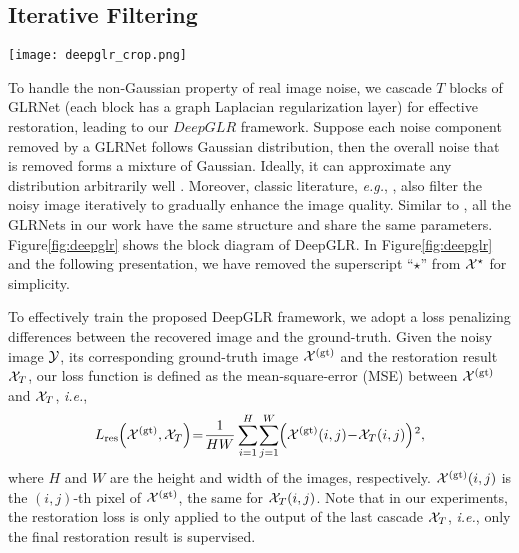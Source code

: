 \documentclass[10pt,twocolumn,letterpaper]{article}
\begin{document}
\subsection{Iterative Filtering}\label{ssec:iter}
\begin{figure*}[t]
\centering
    \texttt{[image: deepglr\_crop.png]}
\caption{Block diagram of the overall DeepGLR framework.}
\label{fig:deepglr}
\end{figure*}
To handle the non-Gaussian property of real image noise, we cascade $T$ blocks of GLRNet (each block has a graph Laplacian regularization layer) for effective restoration, leading to our $DeepGLR$ framework.
Suppose each noise component removed by a GLRNet follows Gaussian distribution, then the overall noise that is removed forms a mixture of Gaussian. 
Ideally, it can approximate any distribution arbitrarily well \cite{reynolds2015gaussian}. 
Moreover, classic literature, {\it e.g.}, \cite{elad2006image,milanfar2013tour,dabov2007image}, also filter the noisy image iteratively to gradually enhance the image quality. 
Similar to \cite{vemulapalli2016deep}, all the GLRNets in our work have the same structure and share the same parameters. 
Figure\;\ref{fig:deepglr} shows the block diagram of DeepGLR. 
In Figure\;\ref{fig:deepglr} and the following presentation, we have removed the superscript ``$\star$'' from ${\cal X}^{\star}$ for simplicity.

To effectively train the proposed DeepGLR framework, we adopt a loss penalizing differences between the recovered image and the ground-truth. 
Given the noisy image ${\cal Y}$, its corresponding ground-truth image ${\cal X}^{(\rm gt)}$ and the restoration result ${\cal X}_T$, our loss function is defined as the mean-square-error (MSE) between ${\cal X}^{(\rm gt)}$ and ${\cal X}_T$, {\it i.e.}, 
\begin{equation}\label{eq:loss_res}
L_{\rm res}\hspace{-2pt}\left({\cal X}^{(\rm gt)}, {\cal X}_T\right)\hspace{-2pt}=\hspace{-2pt}\frac{1}{HW}\sum_{i = 1}^H\hspace{-1pt}\sum_{j = 1}^W\hspace{-2pt}{\left ( {\cal X}^{\rm (gt)}(i,j)\hspace{-2pt}-\hspace{-2pt}{\cal X}_T(i,j) \right)\hspace{-1pt}^2},
\end{equation}
where $H$ and $W$ are the height and width of the images, respectively. ${\cal X}^{\rm (gt)}(i,j)$ is the $(i,j)$-th pixel of ${\cal X}^{\rm (gt)}$, the same for ${\cal X}_T(i,j)$. 
Note that in our experiments, the restoration loss is only applied to the output of the last cascade ${\cal X}_T$, {\it i.e.}, only the final restoration result is supervised.
\end{document}
